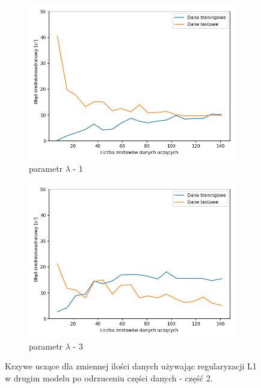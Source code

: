 \documentclass[12pt]{aghdpl}
\begin{document}
		\begin{figure}[h]
			\centering
		 	\begin{subfigure}{.8\linewidth}
		 		\includegraphics[width =\linewidth]{wykresy/7_badanie_danych/l1/regularyzacja_1_learning_curves.png}
		 		\caption{parametr $\lambda$ - 1}
		 	\end{subfigure}
		 	\begin{subfigure}{.8\linewidth}
		 		\includegraphics[width =\linewidth]{wykresy/7_badanie_danych/l1/regularyzacja_3_learning_curves.png}
		 		\caption{parametr $\lambda$ - 3}
		 	\end{subfigure}
		  	
		  	\caption{Krzywe uczące dla zmiennej ilości danych używając regularyzacji L1 w drugim modelu po odrzuceniu części danych - część 2.}
			\label{fig: drugi_model_przy_regularyzacji_l1_po_odrzuceniu_czesci_danych_learning_curves_2}
		\end{figure}
		 	
\end{document}
